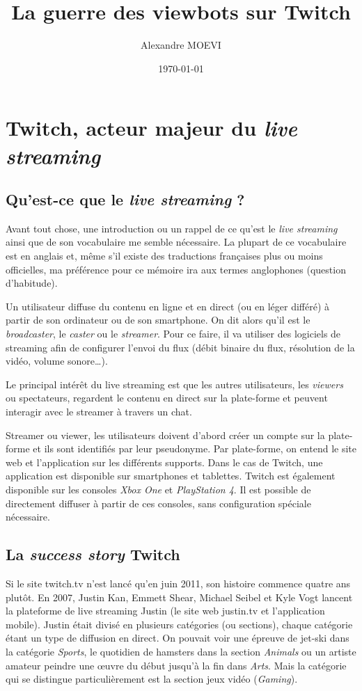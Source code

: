 \documentclass[a4paper]{article}
\title{La guerre des viewbots sur Twitch}
\author{Alexandre MOEVI}
\date{\today}
\begin{document}
\maketitle

\section{Twitch, acteur majeur du \textit{live streaming}}
\subsection{Qu'est-ce que le \textit{live streaming} ?}
Avant tout chose, une introduction ou un rappel de ce qu'est le \textit{live streaming} ainsi que de son vocabulaire me semble nécessaire. La plupart de ce vocabulaire est en anglais et, même s'il existe des traductions françaises plus ou moins officielles, ma préférence pour ce mémoire ira aux termes anglophones (question d'habitude).

Un utilisateur diffuse du contenu en ligne et en direct (ou en léger différé) à partir de son ordinateur ou de son smartphone. On dit alors qu'il est le \textit{broadcaster}, le \textit{caster} ou le \textit{streamer}. Pour ce faire, il va utiliser des logiciels de streaming afin de configurer l'envoi du flux (débit binaire du flux, résolution de la vidéo, volume sonore\ldots).

Le principal intérêt du live streaming est que les autres utilisateurs, les \textit{viewers} ou spectateurs, regardent le contenu en direct sur la plate-forme et peuvent interagir avec le streamer à travers un chat. 

Streamer ou viewer, les utilisateurs doivent d'abord créer un compte sur la plate-forme et ils sont identifiés par leur pseudonyme. Par plate-forme, on entend le site web et l'application sur les différents supports. Dans le cas de Twitch, une application est disponible sur smartphones et tablettes. Twitch est également disponible sur les consoles \textit{Xbox One} et \textit{PlayStation 4}. Il est possible de directement diffuser à partir de ces consoles, sans configuration spéciale nécessaire.

\subsection{La \textit{success story} Twitch}
Si le site twitch.tv n'est lancé qu'en juin 2011, son histoire commence quatre ans plutôt. En 2007, Justin Kan, Emmett Shear, Michael Seibel et Kyle Vogt lancent la plateforme de live streaming Justin (le site web justin.tv et l'application mobile). Justin était divisé en plusieurs catégories (ou sections), chaque catégorie étant un type de diffusion en direct. On pouvait voir une épreuve de jet-ski dans la catégorie \textit{Sports}, le quotidien de hamsters dans la section \textit{Animals} ou un artiste amateur peindre une œuvre du début jusqu'à la fin dans \textit{Arts}. Mais la catégorie qui se distingue particulièrement est la section jeux vidéo (\textit{Gaming}).
\end{document}
